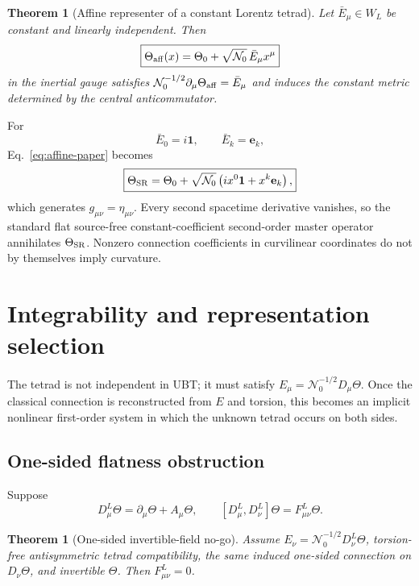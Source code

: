 \documentclass[12pt,a4paper]{article}
\newtheorem{theorem}[definition]{Theorem}
\theoremstyle{remark}\newtheorem{remark}[definition]{Remark}
\begin{document}
\begin{theorem}[Affine representer of a constant Lorentz tetrad]
Let $\bar E_\mu\in W_L$ be constant and linearly independent.  Then
\begin{equation}
 \boxed{
 \Theta_{\rm aff}(x)=\Theta_0+
 \sqrt{\mathcal N_0}\,\bar E_\mu x^\mu}
 \label{eq:affine-paper}
\end{equation}
in the inertial gauge satisfies
$\mathcal N_0^{-1/2}\partial_\mu\Theta_{\rm aff}=\bar E_\mu$ and induces the
constant metric determined by the central anticommutator.
\end{theorem}

For
\begin{equation}
 \bar E_0=i\mathbf1,\qquad \bar E_k=\mathbf e_k,
\end{equation}
Eq.~\eqref{eq:affine-paper} becomes
\begin{equation}
 \boxed{
 \Theta_{\rm SR}=\Theta_0+
 \sqrt{\mathcal N_0}\left(i x^0\mathbf1+x^k\mathbf e_k\right),}
\end{equation}
which generates $g_{\mu\nu}=\eta_{\mu\nu}$.  Every second spacetime derivative
vanishes, so the standard flat source-free constant-coefficient second-order
master operator annihilates $\Theta_{\rm SR}$.  Nonzero connection
coefficients in curvilinear coordinates do not by themselves imply curvature.

\section{Integrability and representation selection}
The tetrad is not independent in UBT; it must satisfy
$E_\mu=\mathcal N_0^{-1/2}D_\mu\Theta$.  Once the classical connection is
reconstructed from $E$ and torsion, this becomes an implicit nonlinear
first-order system in which the unknown tetrad occurs on both sides.

\subsection{One-sided flatness obstruction}
Suppose
\begin{equation}
 D^L_\mu\Theta=\partial_\mu\Theta+A_\mu\Theta,
 \qquad
 [D^L_\mu,D^L_\nu]\Theta=F^L_{\mu\nu}\Theta.
\end{equation}

\begin{theorem}[One-sided invertible-field no-go]
Assume $E_\nu=\mathcal N_0^{-1/2}D^L_\nu\Theta$, torsion-free antisymmetric
tetrad compatibility, the same induced one-sided connection on
$D_\nu\Theta$, and invertible $\Theta$.  Then $F^L_{\mu\nu}=0$.
\end{theorem}
\end{document}

